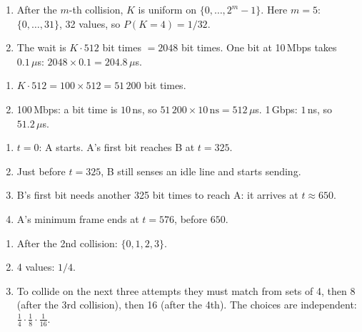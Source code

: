 \begin{enumerate}
  \item After the $m$-th collision, $K$ is uniform on $\{0,\dots,2^m-1\}$. Here $m=5$: $\{0,\dots,31\}$, 32 values, so $P(K=4)=1/32$.
  \item The wait is $K\cdot512$ bit times $=2048$ bit times. One bit at 10\,Mbps takes $0.1\,\mu$s: $2048\times0.1=204.8\,\mu$s.
\end{enumerate}

\begin{enumerate}
  \item $K\cdot512=100\times512=51\,200$ bit times.
  \item 100\,Mbps: a bit time is $10$\,ns, so $51\,200\times10\,\text{ns}=512\,\mu$s. 1\,Gbps: $1$\,ns, so $51.2\,\mu$s.
\end{enumerate}

\begin{enumerate}
  \item $t=0$: A starts. A's first bit reaches B at $t=325$.
  \item Just before $t=325$, B still senses an idle line and starts sending.
  \item B's first bit needs another 325 bit times to reach A: it arrives at $t\approx650$.
  \item A's minimum frame ends at $t=576$, before $650$.
\end{enumerate}

\begin{enumerate}
  \item[(a)] After the 2nd collision: $\{0,1,2,3\}$.
  \item[(b)] 4 values: $1/4$.
  \item[(c)] To collide on the next three attempts they must match from sets of 4, then 8 (after the 3rd collision), then 16 (after the 4th). The choices are independent: $\frac14\cdot\frac18\cdot\frac1{16}$.
\end{enumerate}

